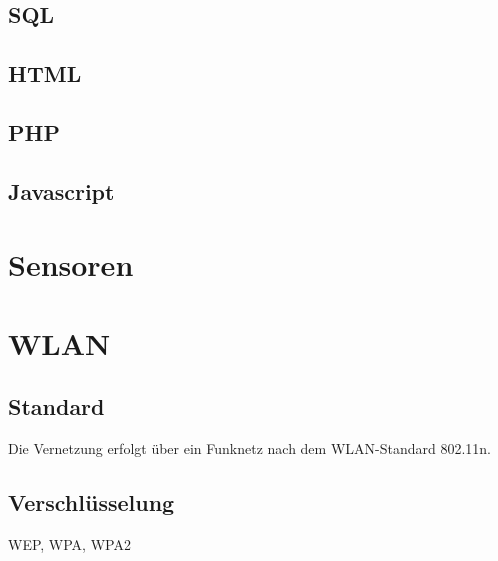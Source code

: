 \subsection{SQL}

\subsection{HTML}

\subsection{PHP}

\subsection{Javascript}

\section{Sensoren}

\section{WLAN}
\subsection{Standard}

Die Vernetzung erfolgt über ein Funknetz nach dem WLAN-Standard 802.11n. 

\subsection{Verschlüsselung}
WEP, WPA, WPA2


